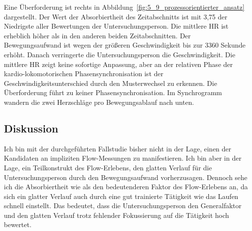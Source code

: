 Eine Überforderung ist rechts in Abbildung~\ref{fig:5_9_prozessorientierter_ansatz} dargestellt. Der Wert der Absorbiertheit des Zeitabschnitts ist mit 3,75 der Niedrigste aller Bewertungen der Untersuchungsperson. Die mittlere \ac{HR} ist erheblich höher als in den anderen beiden Zeitabschnitten. Der Bewegungsaufwand ist wegen der größeren Geschwindigkeit bis zur 3360 Sekunde erhöht. Danach verringerte die Untersuchungsperson die Geschwindigkeit. Die mittlere \ac{HR} zeigt keine sofortige Anpassung, aber an der relativen Phase der kardio-lokomotorischen Phasensynchronisation ist der Geschwindigkeitsunterschied durch den Musterwechsel zu erkennen. Die Überforderung führt zu keiner Phasensynchronisation. Im Synchrogramm wandern die zwei Herzschläge pro Bewegungsablauf nach unten.

\begin{sidewaysfigure}
	\resizebox{1.00\textwidth}{!}{%
		
		}%
	\caption[Prozessdarstellung im Verlauf des Laufens (Fallstudie: Laufen)]{Prozessdarstellung im Verlauf des Laufens -- Drei Minuten Daten aus einem Lauf mit Unterforderung (links), einem optimalen Lauf (mitte) und einem Lauf mit Überforderung (rechts). Quelle: Eigene Darstellung \\ \hspace{\textwidth} \emph{Anmerkung}: Bew. = Bewegungsaufwand \\ \hspace{\textwidth} Rel. Phase = Relative Phase}
	\label{fig:5_9_prozessorientierter_ansatz}
\end{sidewaysfigure}

\subsection{Diskussion}
\label{sub:diskussion_1}
Ich bin mit der durchgeführten Fallstudie bisher nicht in der Lage, einen der Kandidaten an impliziten Flow-Messungen zu manifestieren. Ich bin aber in der Lage, ein Teilkonstrukt des Flow-Erlebens, den glatten Verlauf für die Untersuchungsperson durch den Bewegungsaufwand vorherzusagen. Dennoch sehe ich die Absorbiertheit wie \citep{Peifer2014} als den bedeutenderen Faktor des Flow-Erlebens an, da sich ein glatter Verlauf auch durch eine gut trainierte Tätigkeit wie das Laufen schnell einstellt. Das bedeutet, dass die Untersuchungsperson den Generalfaktor und den glatten Verlauf trotz fehlender Fokussierung auf die Tätigkeit hoch bewertet.

